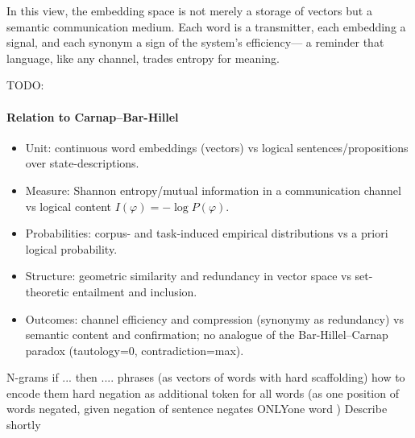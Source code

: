 \documentclass[12pt,a4paper]{article}
\begin{document}
\vspace{1em}

In this view, the embedding space is not merely a storage of vectors but a 
semantic communication medium.  
Each word is a transmitter, each embedding a signal, and each synonym a sign of the system's efficiency---  
a reminder that language, like any channel, trades entropy for meaning.

TODO:
\paragraph*{Relation to Carnap–Bar-Hillel}
\begin{itemize}
\item Unit: continuous word embeddings (vectors) vs logical sentences/propositions over state-descriptions.
\item Measure: Shannon entropy/mutual information in a communication channel vs logical content \(I(\varphi) = -\log P(\varphi)\).
\item Probabilities: corpus- and task-induced empirical distributions vs a priori logical probability.
\item Structure: geometric similarity and redundancy in vector space vs set-theoretic entailment and inclusion.
\item Outcomes: channel efficiency and compression (synonymy as redundancy) vs semantic content and confirmation; no analogue of the Bar-Hillel–Carnap paradox (tautology=0, contradiction=max).
\end{itemize}


N-grams 
if ... then .... phrases (as vectors of words  with hard scaffolding) 
how to encode them hard 
negation as additional token for all words (as one position of words negated, given negation of sentence negates ONLYone word )
Describe shortly 
\end{document}
